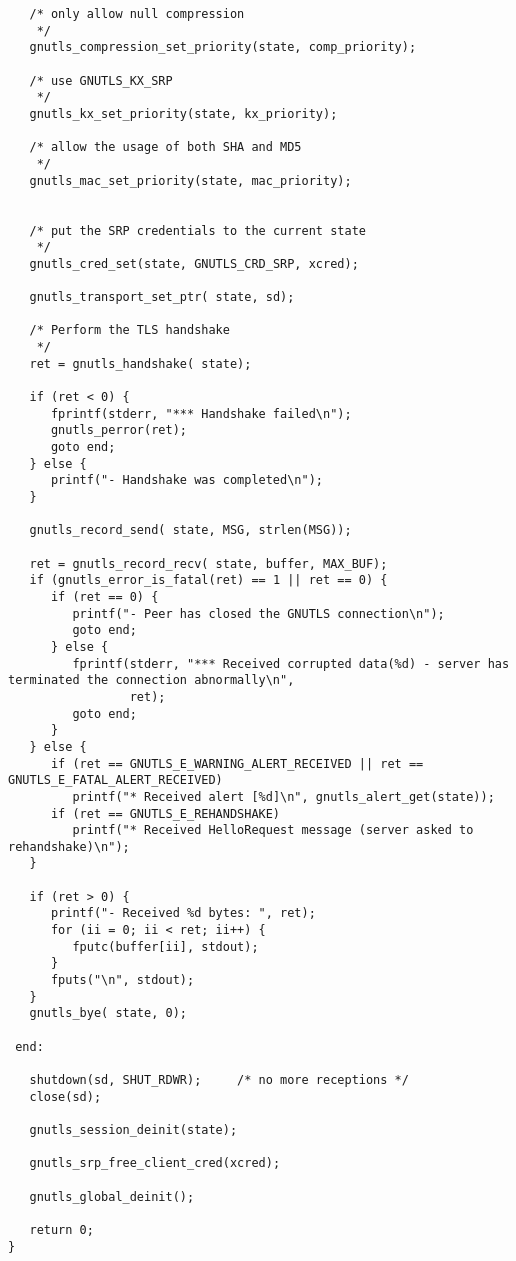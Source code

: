 \begin{verbatim}
   /* only allow null compression
    */
   gnutls_compression_set_priority(state, comp_priority);
 
   /* use GNUTLS_KX_SRP
    */
   gnutls_kx_set_priority(state, kx_priority);
 
   /* allow the usage of both SHA and MD5
    */
   gnutls_mac_set_priority(state, mac_priority);


   /* put the SRP credentials to the current state
    */
   gnutls_cred_set(state, GNUTLS_CRD_SRP, xcred);

   gnutls_transport_set_ptr( state, sd);

   /* Perform the TLS handshake
    */
   ret = gnutls_handshake( state);

   if (ret < 0) {
      fprintf(stderr, "*** Handshake failed\n");
      gnutls_perror(ret);
      goto end;
   } else {
      printf("- Handshake was completed\n");
   }

   gnutls_record_send( state, MSG, strlen(MSG));

   ret = gnutls_record_recv( state, buffer, MAX_BUF);
   if (gnutls_error_is_fatal(ret) == 1 || ret == 0) {
      if (ret == 0) {
         printf("- Peer has closed the GNUTLS connection\n");
         goto end;
      } else {
         fprintf(stderr, "*** Received corrupted data(%d) - server has terminated the connection abnormally\n",
                 ret);
         goto end;
      }
   } else {
      if (ret == GNUTLS_E_WARNING_ALERT_RECEIVED || ret == GNUTLS_E_FATAL_ALERT_RECEIVED)
         printf("* Received alert [%d]\n", gnutls_alert_get(state));
      if (ret == GNUTLS_E_REHANDSHAKE)
         printf("* Received HelloRequest message (server asked to rehandshake)\n");
   }

   if (ret > 0) {
      printf("- Received %d bytes: ", ret);
      for (ii = 0; ii < ret; ii++) {
         fputc(buffer[ii], stdout);
      }
      fputs("\n", stdout);
   }
   gnutls_bye( state, 0);

 end:

   shutdown(sd, SHUT_RDWR);     /* no more receptions */
   close(sd);

   gnutls_session_deinit(state);

   gnutls_srp_free_client_cred(xcred);

   gnutls_global_deinit();

   return 0;
}

\end{verbatim}
